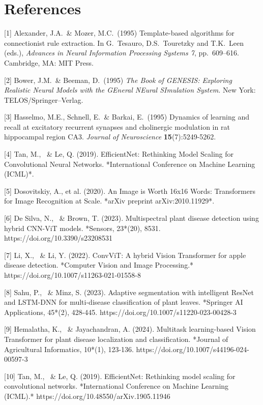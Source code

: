 \documentclass{article}
\begin{document}
\section*{References}

{
\small
[1] Alexander, J.A.\ \& Mozer, M.C.\ (1995) Template-based algorithms for
connectionist rule extraction. In G.\ Tesauro, D.S.\ Touretzky and T.K.\ Leen
(eds.), {\it Advances in Neural Information Processing Systems 7},
pp.\ 609--616. Cambridge, MA: MIT Press.

[2] Bower, J.M.\ \& Beeman, D.\ (1995) {\it The Book of GENESIS: Exploring
  Realistic Neural Models with the GEneral NEural SImulation System.}  New York:
TELOS/Springer--Verlag.

[3] Hasselmo, M.E., Schnell, E.\ \& Barkai, E.\ (1995) Dynamics of learning and
recall at excitatory recurrent synapses and cholinergic modulation in rat
hippocampal region CA3. {\it Journal of Neuroscience} {\bf 15}(7):5249-5262.
}

[4] Tan, M., \ \& Le, Q. (2019). EfficientNet: Rethinking Model Scaling for Convolutional Neural Networks. *International Conference on Machine Learning (ICML)*.

[5] Dosovitskiy, A., et al. (2020). An Image is Worth 16x16 Words: Transformers for Image Recognition at Scale. *arXiv preprint arXiv:2010.11929*.

[6] De Silva, N., \ \& Brown, T. (2023). Multispectral plant disease detection using hybrid CNN-ViT models. *Sensors, 23*(20), 8531. https://doi.org/10.3390/s23208531  

[7] Li, X., \ \& Li, Y. (2022). ConvViT: A hybrid Vision Transformer for apple disease detection. *Computer Vision and Image Processing.* https://doi.org/10.1007/s11263-021-01558-8  

[8] Sahu, P., \ \& Minz, S. (2023). Adaptive segmentation with intelligent ResNet and LSTM-DNN for multi-disease classification of plant leaves. *Springer AI Applications, 45*(2), 428-445. https://doi.org/10.1007/s11220-023-00428-3  

[9] Hemalatha, K., \ \& Jayachandran, A. (2024). Multitask learning-based Vision Transformer for plant disease localization and classification. *Journal of Agricultural Informatics, 10*(1), 123-136. https://doi.org/10.1007/s44196-024-00597-3  

[10] Tan, M., \ \& Le, Q. (2019). EfficientNet: Rethinking model scaling for convolutional networks. *International Conference on Machine Learning (ICML).* https://doi.org/10.48550/arXiv.1905.11946
\end{document}
